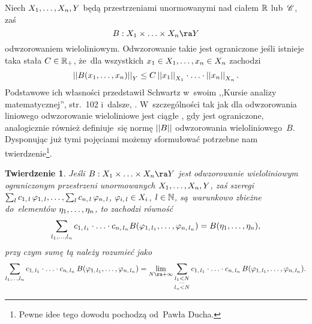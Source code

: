 \documentclass[a4paper,11pt]{article}
\newtheorem{twr}{Twierdzenie} %
\begin{document}
Niech $X_{ 1 }, \ldots, X_{ n }, Y$ będą przestrzeniami unormowanymi nad
ciałem $\mathbb{R}$ lub~$\mathcal{C}$, zaś
\begin{equation*}
  B: X_{ 1 } \ti \ld \ti X_{ n } \ra Y
\end{equation*}
odwzorowaniem wieloliniowym. Odwzorowanie takie jest ograniczone jeśli
istnieje taka stała $C \in \mathbb{R}_{ + }$, że~dla wszystkich
$x_{ 1 } \in X_{ 1 }, \ldots, x_{ n } \in X_{ n }$ zachodzi
\begin{equation}
  \left|\left|  B( x_{ 1 }, \ldots, x_{ n } )  \right|\right|_{ Y } \leq C
  \left|\left|  x_{ 1 }  \right|\right|_{ X_{ 1 } } \cdot \ldots \cdot \left|\left|  x_{ n }  \right|\right|_{ X_{ n } }.
\end{equation}
Podstawowe ich własności przedstawił Schwartz w~swoim ,,Kursie analizy
matematycznej'', str.~102 i~dalsze,
\cite{SchwartzKursAnalizyMatematycznej79}. W~szczególności tak jak dla
odwzorowania liniowego odwzorowanie wieloliniowe jest ciągłe \wtw, gdy
jest ograniczone, analogicznie również definiuje~się normę
$\left|\left|  B  \right|\right|$ odwzorowania wieloliniowego~$B$. Dysponując już tymi
pojęciami możemy sformułować potrzebne nam twierdzenie\footnote{Pewne
  idee tego dowodu pochodzą od~Pawła Ducha.}.

\begin{twr}
  \label{twr:OdwzorowanieWielolinioweCiagle}
  Jeśli $B: X_{ 1 } \ti \ld \ti X_{ n } \ra Y$ jest odwzorowanie
  wieloliniowym ograniczonym przestrzeni unormowanych
  $X_{ 1 }, \ldots, X_{ n }, Y$, zaś szeregi
  $\sum_{ l } c_{ 1, \, l } \, \varphi_{ 1, \, l }, \ldots, \sum_{ l } c_{ n,
    \, l } \, \varphi_{ n, \, l }$, $\varphi_{ i, \, l } \in X_{ i }$,
  $l \in \mathbb{N}$, są~warunkowo zbieżne do~elementów
  $\eta_{ 1 }, \ldots, \eta_{ n }$, to zachodzi równość
  \begin{equation*}
    \sum\limits_{ l_{ 1 }, \ldots, l_{ n } } c_{ 1, \, l_{ 1 } } \cdot \ldots \cdot
    c_{ n, \, l_{ n } } B( \varphi_{ 1, \, l_{ 1 } }, \ldots,
    \varphi_{ n, \, l_{ n } } ) = B( \eta_{ 1 }, \ldots, \eta_{ n } ),
  \end{equation*}
  przy czym sumę tą należy rozumieć jako
  \begin{equation*}
    \Sum_{ l_{ 1 }, \ld, l_{ n } } c_{ 1, \, l_{ 1 } } \cdot \ld \cdot
    c_{ n, \, l_{ n } } \, B( \vp_{ 1, \, l_{ 1 } }, \ld,
    \vp_{ n, \, l_{ n } } ) = \Lim_{ N \ra +\infty }
    \Sum_{ \substack{ l_{ 1 } < N \\ \cdots \\ l_{ n } < N } }
    c_{ 1, \, l_{ 1 } } \cdot \ld \cdot c_{ n, \, l_{ n } } \,
    B( \vp_{ 1, \, l_{ 1 } }, \ld, \vp_{ n, \, l_{ n } } ).
  \end{equation*}
\end{twr}
\end{document}
